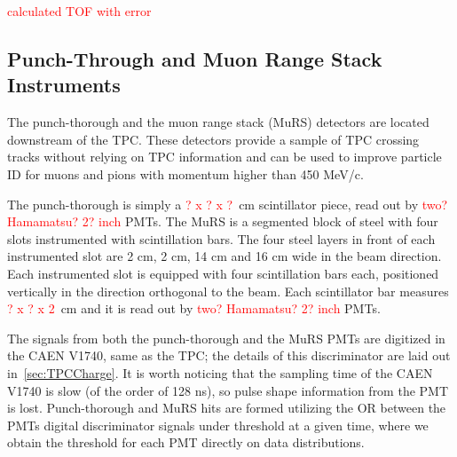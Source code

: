 \textcolor{red}{calculated TOF with error}


\subsection{Punch-Through and Muon Range Stack Instruments}\label{sec:MuRS}

The punch-thorough and the muon range stack (MuRS) detectors are located downstream of the TPC. These detectors provide a sample of  TPC crossing tracks without relying on TPC information and can be used to improve particle ID for  muons and pions with momentum higher than  450 MeV/c.

The punch-thorough is simply a \textcolor{red}{? x ? x ?}~cm scintillator piece, read out by \textcolor{red}{ two? Hamamatsu? 2? inch} PMTs. 
The MuRS is a segmented block of steel with four slots instrumented with scintillation bars. The four steel layers in front of each instrumented slot are 2 cm, 2 cm, 14 cm and 16 cm wide in the beam direction. Each instrumented slot is equipped with four scintillation bars each, positioned vertically in the direction orthogonal to the beam. Each scintillator bar measures  \textcolor{red}{? x ? x 2}~cm and it is read out by  \textcolor{red}{ two? Hamamatsu? 2? inch} PMTs.  

The signals from both the punch-thorough and the MuRS PMTs are digitized in the CAEN V1740, same as the TPC; the details of this discriminator are laid out in~\ref{sec:TPCCharge}. It is worth noticing that the sampling time of the CAEN V1740 is slow (of the order of 128 ns), so pulse shape information from the PMT is lost.
Punch-thorough and MuRS hits are formed utilizing the OR between the PMTs digital discriminator signals under threshold at a given time, where we obtain the threshold for each PMT directly on data distributions.



